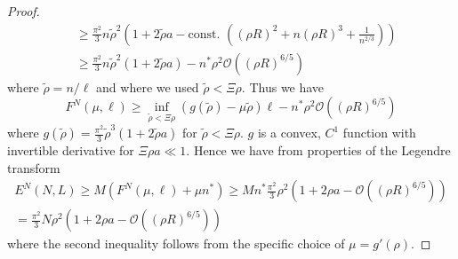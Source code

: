 \documentclass[a4paper,11pt]{article}
\numberwithin{equation}{section}
\begin{document}
\begin{proof}
\begin{equation}
\begin{aligned}
		&\geq\frac{\pi^2}{3}n\tilde{\rho}^2\left(1+2\tilde{\rho}a-\text{const. }\left((\rho R)^2+n(\rho R)^3+\frac{1}{n^{2/3}}\right)\right)\\
		&\geq \frac{\pi^2}{3}n\tilde{\rho}^2\left(1+2\tilde{\rho}a\right)-n^*\rho^2\mathcal{O}\left((\rho R)^{6/5}\right)
		\end{aligned}
		\end{equation}
		where $ \tilde{\rho}=n/\ell $ and where we used $ \tilde{\rho}<\Xi\rho$.
		Thus we have \begin{equation}
		F^{N}(\mu,\ell)\geq \inf_{\tilde{\rho}<\Xi\rho}(g(\tilde{\rho})-\mu\tilde{\rho})\ell-n^\ast \rho^2 \mathcal{O}\left((\rho R)^{6/5}\right)
		\end{equation}
			where $
		g(\tilde{\rho})=
		\frac{\pi^2}{3}\tilde{\rho}^3\left(1+2\tilde{\rho}a\right)
		$ for $ \tilde{\rho}<\Xi\rho $. $ g $ is a convex, $ C^{1} $ function with invertible derivative for $ \Xi\rho a\ll 1  $. Hence we have from properties of the Legendre transform \begin{equation}
		\begin{aligned}
		E^{N}(N,L)\geq M(F^{N}(\mu,\ell)+\mu n^*)\geq Mn^\ast\frac{\pi^2}{3} \rho^2 \left(1+2\rho a-\mathcal{O}\left((\rho R)^{6/5}\right)\right)\\
		=\frac{\pi^2}{3} N\rho^2 \left(1+2\rho a-\mathcal{O}\left((\rho R)^{6/5}\right)\right)
		\end{aligned}
		\end{equation}
		where the second inequality follows from the specific choice of $ \mu=g'(\rho) $.
	\end{proof}
	
	
	
\end{document}
